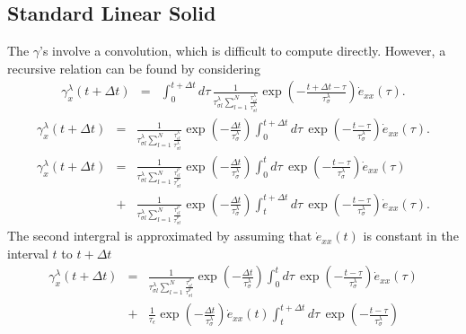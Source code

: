 \documentclass[11pt]{article}
\begin{document}
\subsection*{Standard Linear Solid}
The $\gamma$'s involve a convolution, which is difficult to compute directly.
However, a recursive relation can be found by considering
\begin{eqnarray*}
\gamma^{\lambda}_x(t+\Delta t) & = &
  \int^{t+\Delta t}_0 d\tau\,
  \frac{1}{\tau^{\lambda}_{\sigma l}
   {\sum_{l=1}^N \frac{\tau^{\lambda}_{\epsilon l}}
   {\tau^{\lambda}_{\sigma l}}} }
  \exp(-\frac{t+\Delta t -\tau}{\tau^{\lambda}_{\sigma}})
  \dot{e}_{xx}(\tau).
\end{eqnarray*}
\begin{eqnarray*}
\gamma^{\lambda}_x(t+\Delta t) & = &
  \frac{1}{\tau^{\lambda}_{\sigma l}{\sum_{l=1}^N \frac{\tau^{\lambda}_{\epsilon l}}{\tau^{\lambda}_{\sigma l}}} }
  \exp(-\frac{\Delta t}{\tau^{\lambda}_{\sigma}})
  \int^{t+\Delta t}_{0} d\tau\,
  \exp(-\frac{t-\tau}{\tau^{\lambda}_{\sigma}})
  \dot{e}_{xx}(\tau).
\end{eqnarray*}
\begin{eqnarray*}
\gamma^{\lambda}_x(t+\Delta t) 
 & = & 
  \frac{1}{\tau^{\lambda}_{\sigma l}\sum_{l=1}^N \frac{\tau^{\rho}_{\epsilon l}}{\tau^{\rho}_{\sigma l}}}
  \exp(-\frac{\Delta t}{\tau^{\lambda}_{\sigma}})
  \int^{t}_0 d\tau\,
  \exp(-\frac{t-\tau}{\tau^{\lambda}_{\sigma}})
  \dot{e}_{xx}(\tau)\\
 & + &
  \frac{1}{\tau^{\lambda}_{\sigma l}\sum_{l=1}^N \frac{\tau^{\rho}_{\epsilon l}}{\tau^{\rho}_{\sigma l}}}
  \exp(-\frac{\Delta t}{\tau^{\lambda}_{\sigma}})
  \int^{t+\Delta t}_t d\tau\,
  \exp(-\frac{t-\tau}{\tau^{\lambda}_{\sigma}})
  \dot{e}_{xx}(\tau).
\end{eqnarray*}
The second intergral is approximated by
 assuming that $\dot{e}_{xx}(t)$ is constant in the interval $t$ to $t+\Delta t$
\begin{eqnarray*}
\gamma^{\lambda}_x(t+\Delta t) 
 & = & %
  \frac{1}{\tau^{\lambda}_{\sigma l}\sum_{l=1}^N \frac{\tau^{\rho}_{\epsilon l}}{\tau^{\rho}_{\sigma l}}}
\exp(-\frac{\Delta t}{\tau^{\lambda}_{\sigma}})
       \int^{t}_0 d\tau\,
       \exp(-\frac{t-\tau}{\tau^{\lambda}_{\sigma}})
       \dot{e}_{xx}(\tau)\\
 & + &
       \frac{1}{\tau_{\epsilon}} \exp(-\frac{\Delta t}{\tau^{\lambda}_{\sigma}})
       \dot{e}_{xx}(t)\int^{t+\Delta t}_t d\tau\,
       \exp(-\frac{t-\tau}{\tau^{\lambda}_{\sigma}})
\end{eqnarray*}
\end{document}
